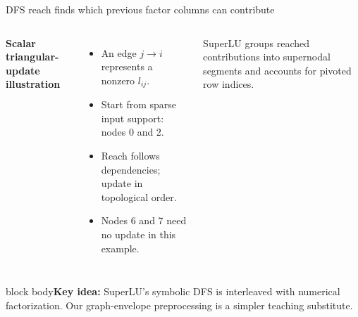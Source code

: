 \documentclass[aspectratio=169,10pt]{beamer}
\newcommand{\takeaway}[1]{\vfill\begin{beamercolorbox}[sep=7pt,wd=\textwidth]{block body}\small\textbf{Key idea:} #1\end{beamercolorbox}}
\begin{document}
\begin{frame}{DFS reach finds which previous factor columns can contribute}
\begin{columns}[c,onlytextwidth]
\textbf{Scalar triangular-update illustration}
\begin{itemize}\setlength\itemsep{5pt}
\item An edge $j\to i$ represents a nonzero $l_{ij}$.
\item Start from sparse input support: nodes 0 and 2.
\item Reach follows dependencies; update in topological order.
\item Nodes 6 and 7 need no update in this example.
\end{itemize}
\small SuperLU groups reached contributions into supernodal segments and accounts for pivoted row indices.
\end{columns}
\takeaway{SuperLU's symbolic DFS is interleaved with numerical factorization. Our graph-envelope preprocessing is a simpler teaching substitute.}
\end{frame}
\end{document}
